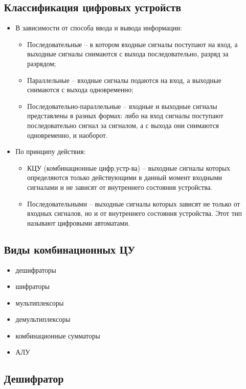 \documentclass[unicode, 12pt, a4paper, oneside]{article}
\begin{document}
\subsection*{Классификация цифровых устройств}

\begin{itemize}
\item В зависимости от способа  ввода и вывода информации:
	\begin{itemize}
	\item Последовательные – в котором входные сигналы поступают на вход, а выходные сигналы снимаются с выхода последовательно, разряд за разрядом;
	\item Параллельные – входные сигналы подаются на вход, а выходные снимаются с выхода одновременно;
	\item Последовательно-параллельные – входные и выходные сигналы представлены в разных формах: либо на вход сигналы поступают последовательно сигнал за сигналом, а с выхода они снимаются одновременно, и наоборот.
	\end{itemize}
\item По принципу действия:
	\begin{itemize}
	\item КЦУ (комбинационные цифр.устр-ва) – выходные сигналы которых определяются только действующими в данный момент входными сигналами и не зависят от внутреннего состояния устройства.
	\item Последовательными – выходные сигналы которых зависят не только от входных сигналов, но и от внутреннего состояния устройства. Этот тип называют цифровыми автоматами.
	\end{itemize}
\end{itemize}

\subsection*{Виды комбинационных ЦУ}
\begin{itemize}
\item дешифраторы
\item шифраторы
\item мультиплексоры
\item демультиплексоры
\item комбинационные сумматоры
\item АЛУ
\end{itemize}


\subsection*{Дешифратор}
\end{document}
